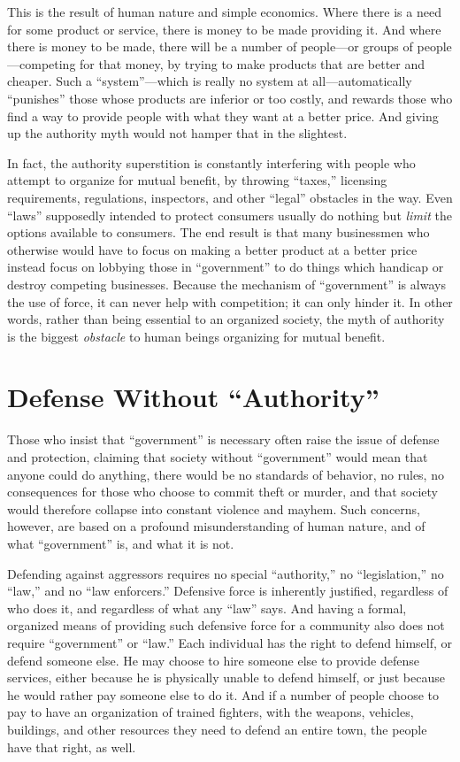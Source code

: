 \documentclass{book}
\begin{document}
This is the result of human nature and simple economics. Where there is a need for some product or service, there is money to be made providing it. And where there is money to be made, there will be a number of people---or groups of people---competing for that money, by trying to make products that are better and cheaper. Such a \enquote{system}---which is really no system at all---automatically \enquote{punishes} those whose products are inferior or too costly, and rewards those who find a way to provide people with what they want at a better price. And giving up the authority myth would not hamper that in the slightest.

In fact, the authority superstition is constantly interfering with people who attempt to organize for mutual benefit, by throwing \enquote{taxes,} licensing requirements, regulations, inspectors, and other \enquote{legal} obstacles in the way. Even \enquote{laws} supposedly intended to protect consumers usually do nothing but \emph{limit} the options available to consumers. The end result is that many businessmen who otherwise would have to focus on making a better product at a better price instead focus on lobbying those in \enquote{government} to do things which handicap or destroy competing businesses. Because the mechanism of \enquote{government} is always the use of force, it can never help with competition; it can only hinder it. In other words, rather than being essential to an organized society, the myth of authority is the biggest \emph{obstacle} to human beings organizing for mutual benefit.

\section{Defense Without \enquote{Authority}}

Those who insist that \enquote{government} is necessary often raise the issue of defense and protection, claiming that society without \enquote{government} would mean that anyone could do anything, there would be no standards of behavior, no rules, no consequences for those who choose to commit theft or murder, and that society would therefore collapse into constant violence and mayhem. Such concerns, however, are based on a profound misunderstanding of human nature, and of what \enquote{government} is, and what it is not.

Defending against aggressors requires no special \enquote{authority,} no \enquote{legislation,} no \enquote{law,} and no \enquote{law enforcers.} Defensive force is inherently justified, regardless of who does it, and regardless of what any \enquote{law} says. And having a formal, organized means of providing such defensive force for a community also does not require \enquote{government} or \enquote{law.} Each individual has the right to defend himself, or defend someone else. He may choose to hire someone else to provide defense services, either because he is physically unable to defend himself, or just because he would rather pay someone else to do it. And if a number of people choose to pay to have an organization of trained fighters, with the weapons, vehicles, buildings, and other resources they need to defend an entire town, the people have that right, as well.
\end{document}
